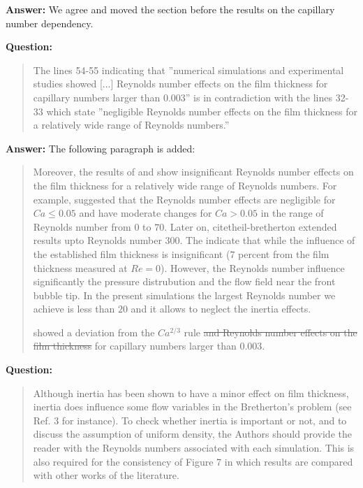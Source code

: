 \documentclass{article}
\begin{document}
\textbf{Answer:} We agree and moved the section before the results on the capillary number
dependency.


\textbf{Question:}
\begin{quotation}
The lines 54-55 indicating that ”numerical simulations and experimental studies showed [...]
Reynolds
number effects on the ﬁlm thickness for capillary numbers larger than 0.003” is in contradiction
with
the lines 32-33 which state ”negligible Reynolds number effects on the film thickness for a
relatively
wide range of Reynolds numbers.”
\end{quotation}

\textbf{Answer:} The following paragraph is added:
\begin{quotation}
Moreover, the results of \citet{giavedoni-numerical} and \citet{heil-bretherton} show
{\color{red} insignificant} Reynolds number effects on the film thickness for a relatively wide
range of Reynolds
numbers. 
{\color{red} For example, \citet{giavedoni-numerical} suggested that the Reynolds number effects
are negligible for $Ca\leq0.05$ and have moderate changes for $Ca>0.05$ in the range of Reynolds
number from $0$ to $70$. Later on, citet{heil-bretherton} extended results upto Reynolds number
$300$. The indicate that while the influence of the established film thickness is insignificant
($7$ percent from the film thickness measured at $Re=0$). However, the Reynolds number influence
significantly the pressure distrubution and the flow field near the front bubble tip. In
the present simulations the largest Reynolds number we achieve is less than $20$ and it allows to
neglect the
inertia effects.} 

\citet{kreutzer-pressure-drop} showed a deviation from the $Ca^{2/3}$ rule
{\color{red}\sout{and Reynolds number 
effects on the film thickness}} for capillary numbers larger than $0.003$.
\end{quotation}

\textbf{Question:}
\begin{quotation}
Although inertia has been shown to have a minor effect on ﬁlm thickness, inertia does influence
some flow variables in the Bretherton’s problem (see Ref. 3 for instance). To check whether inertia
is important or not, and to discuss the assumption of uniform density, the Authors should provide
the reader with the Reynolds numbers associated with each simulation. This is also required for the
consistency of Figure 7 in which results are compared with other works of the literature.
\end{quotation}
\end{document}
